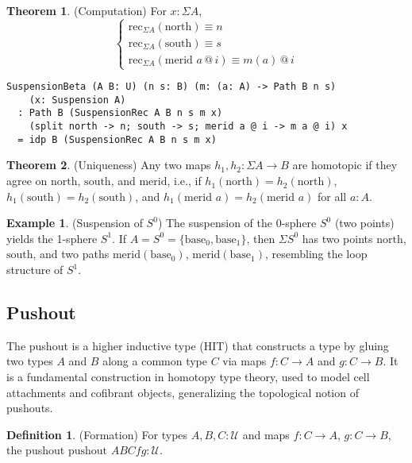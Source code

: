 \documentclass{article}
\theoremstyle{definition}
\newtheorem{theorem}{Theorem}
\newtheorem{definition}{Definition}
\newtheorem{example}{Example}
\begin{document}
\begin{theorem} (Computation)
For $x : \Sigma A$,
\[
\begin{cases}
\text{rec}_{\Sigma A}(\text{north}) \equiv n \\
\text{rec}_{\Sigma A}(\text{south}) \equiv s \\
\text{rec}_{\Sigma A}(\text{merid } a \, @ \, i) \equiv m(a) \, @ \, i
\end{cases}
\]
\begin{lstlisting}
SuspensionBeta (A B: U) (n s: B) (m: (a: A) -> Path B n s)
    (x: Suspension A)
  : Path B (SuspensionRec A B n s m x)
    (split north -> n; south -> s; merid a @ i -> m a @ i) x
  = idp B (SuspensionRec A B n s m x)
\end{lstlisting}
\end{theorem}

\begin{theorem} (Uniqueness)
Any two maps $h_1, h_2 : \Sigma A \to B$ are homotopic if they agree on $\text{north}$, $\text{south}$, and $\text{merid}$, i.e., if $h_1(\text{north}) = h_2(\text{north})$, $h_1(\text{south}) = h_2(\text{south})$, and $h_1(\text{merid } a) = h_2(\text{merid } a)$ for all $a : A$.
\end{theorem}

\begin{example} (Suspension of $S^0$)
The suspension of the 0-sphere $S^0$ (two points) yields the 1-sphere $S^1$. If $A = S^0 = \{ \text{base}_0, \text{base}_1 \}$, then $\Sigma S^0$ has two points $\text{north}$, $\text{south}$, and two paths $\text{merid}(\text{base}_0)$, $\text{merid}(\text{base}_1)$, resembling the loop structure of $S^1$.
\end{example}


\subsection{Pushout}
The pushout is a higher inductive type (HIT) that constructs a type by gluing two types $A$ and $B$ along a common type $C$ via maps $f : C \to A$ and $g : C \to B$. It is a fundamental construction in homotopy type theory, used to model cell attachments and cofibrant objects, generalizing the topological notion of pushouts.

\begin{definition} (Formation)
For types $A, B, C : \mathcal{U}$ and maps $f : C \to A$, $g : C \to B$, the pushout $\text{pushout } A B C f g : \mathcal{U}$.
\end{definition}
\end{document}
